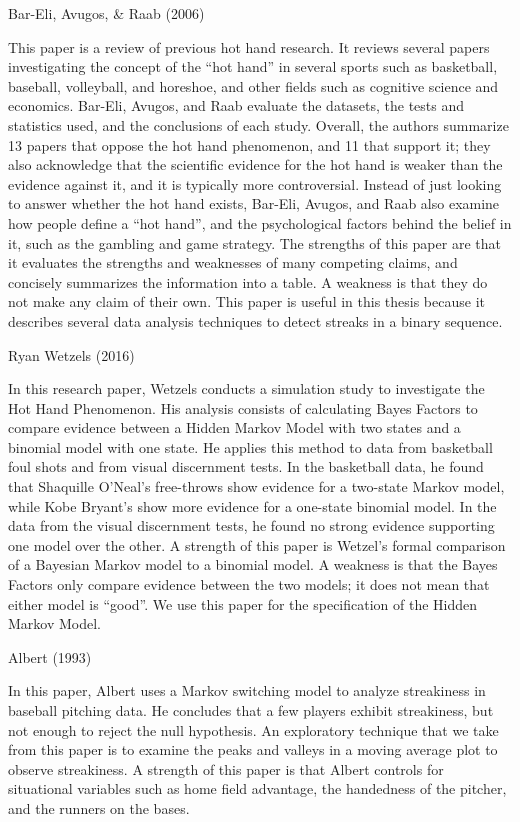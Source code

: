 \documentclass[12pt,twoside]{dukestatscithesis}
\theoremstyle{definition}
\theoremstyle{definition}
\theoremstyle{definition}
\theoremstyle{remark}
\begin{document}
Bar-Eli, Avugos, \& Raab (2006)

This paper is a review of previous hot hand research. It reviews several
papers investigating the concept of the ``hot hand'' in several sports
such as basketball, baseball, volleyball, and horeshoe, and other fields
such as cognitive science and economics. Bar-Eli, Avugos, and Raab
evaluate the datasets, the tests and statistics used, and the
conclusions of each study. Overall, the authors summarize 13 papers that
oppose the hot hand phenomenon, and 11 that support it; they also
acknowledge that the scientific evidence for the hot hand is weaker than
the evidence against it, and it is typically more controversial. Instead
of just looking to answer whether the hot hand exists, Bar-Eli, Avugos,
and Raab also examine how people define a ``hot hand'', and the
psychological factors behind the belief in it, such as the gambling and
game strategy. The strengths of this paper are that it evaluates the
strengths and weaknesses of many competing claims, and concisely
summarizes the information into a table. A weakness is that they do not
make any claim of their own. This paper is useful in this thesis because
it describes several data analysis techniques to detect streaks in a
binary sequence.

Ryan Wetzels (2016)

In this research paper, Wetzels conducts a simulation study to
investigate the Hot Hand Phenomenon. His analysis consists of
calculating Bayes Factors to compare evidence between a Hidden Markov
Model with two states and a binomial model with one state. He applies
this method to data from basketball foul shots and from visual
discernment tests. In the basketball data, he found that Shaquille
O'Neal's free-throws show evidence for a two-state Markov model, while
Kobe Bryant's show more evidence for a one-state binomial model. In the
data from the visual discernment tests, he found no strong evidence
supporting one model over the other. A strength of this paper is
Wetzel's formal comparison of a Bayesian Markov model to a binomial
model. A weakness is that the Bayes Factors only compare evidence
between the two models; it does not mean that either model is ``good''.
We use this paper for the specification of the Hidden Markov Model.

Albert (1993)

In this paper, Albert uses a Markov switching model to analyze
streakiness in baseball pitching data. He concludes that a few players
exhibit streakiness, but not enough to reject the null hypothesis. An
exploratory technique that we take from this paper is to examine the
peaks and valleys in a moving average plot to observe streakiness. A
strength of this paper is that Albert controls for situational variables
such as home field advantage, the handedness of the pitcher, and the
runners on the bases.
\end{document}
